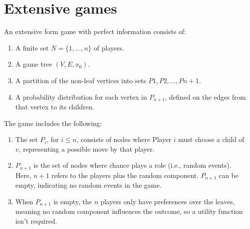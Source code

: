 \section{Extensive games}

\begin{definition}
    An extensive form game with perfect information consists of:
\end{definition}
\begin{enumerate}
    \item A finite set $N = \{1,\dots,n\}$ of players. 
    \item A game tree $(V,E,x_0)$.
    \item A partition of the non-leaf vertices into sets ${P1, P2, \dots , Pn+1}$.
    \item A probability distribution for each vertex in $P_{n+1}$, defined on the edges from that vertex to its children.
\end{enumerate}
The game includes the following:
\begin{enumerate}
    \item The set $P_i$, for $i \leq n$, consists of nodes where Player $i$ must choose a child of $v$, representing a possible move by that player.
    \item $P_{n+1}$ is the set of nodes where chance plays a role (i.e., random events). 
        Here, $n + 1$ refers to the players plus the random component. $P_{n+1}$ can be empty, indicating no random events in the game.
    \item When $P_{n+1}$ is empty, the $n$ players only have preferences over the leaves, meaning no random component influences the outcome, so a utility function isn't required.
\end{enumerate}

